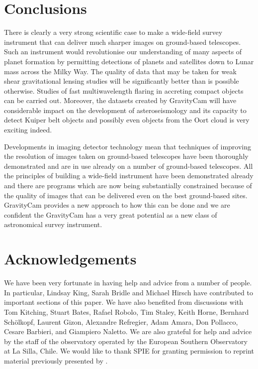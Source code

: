 \documentclass{pasa}%
\begin{document}
\section{Conclusions}
\label{Sect:Conclusions}

There is clearly a very strong scientific case to make a wide-field survey instrument that can deliver much sharper images on ground-based telescopes.  Such an instrument would revolutionise our understanding of many aspects of planet formation by permitting detections of planets and satellites down to Lunar mass across the Milky Way.  The quality of data that may be taken for weak shear gravitational lensing studies will be significantly better than is possible otherwise. Studies of fast multiwavelength flaring in accreting compact objects can be carried out. Moreover, the datasets created by \mbox{GravityCam} will have considerable impact on the development of asteroseismology and its capacity to detect Kuiper belt objects and possibly even objects from the Oort cloud is very exciting indeed.


Developments in imaging detector technology mean that techniques of improving the resolution of images taken on ground-based telescopes have been thoroughly demonstrated and are in use already on a number of ground-based telescopes.  All the principles of building a wide-field instrument have been demonstrated already and there are programs which are now being substantially constrained because of the quality of images that can be delivered even on the best ground-based sites.  \mbox{GravityCam} provides a new approach to how this can be done and we are confident the \mbox{GravityCam} has a very great potential as a new class of astronomical survey instrument.




\section*{Acknowledgements}

We have been very fortunate in having help and advice from a number of people.  In particular, Lindsay King, Sarah Bridle and Michael Hirsch have contributed to important sections of this paper.  We have also benefited from discussions with Tom Kitching, Stuart Bates, Rafael Robolo, Tim Staley, Keith Horne, Bernhard Sch\"{o}lkopf, Laurent Gizon, Alexandre Refregier, Adam Amara, Don Pollacco, Cesare Barbieri, and Giampiero Naletto.
  We are also grateful for help and advice by the staff of the observatory operated by the European Southern Observatory at La Silla, Chile. We would like to thank SPIE for granting permission to reprint material previously presented by \citet{SPIE:GravityCam}.




\end{document}
